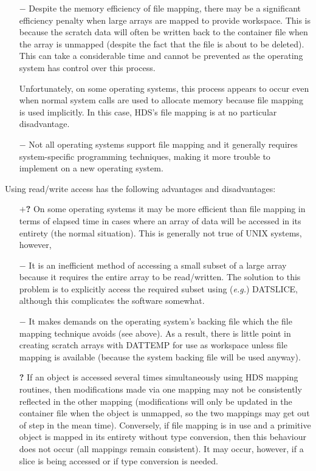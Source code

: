 \documentclass[twoside,11pt]{article}
\newcommand{\htmlref}[2]{#1}
\renewcommand{\_}{\texttt{\symbol{95}}}
\newcommand{\st}[1]{{\em{#1}}}
\newcommand{\mplus}[0]{{$+$}}
\newcommand{\mplus}[0]{+}
\begin{document}
\begin{description}
\begin{itemize}
\item[{\bf $-$}] Despite the memory efficiency of file mapping, there may be
a significant efficiency penalty when large arrays are mapped to
provide workspace. This is because the scratch data will often be
written back to the container file when the array is unmapped (despite
the fact that the file is about to be deleted). This can take a
considerable time and cannot be prevented as the operating system has
control over this process.

Unfortunately, on some operating systems, this process appears to
occur even when normal system calls are used to allocate memory
because file mapping is used implicitly. In this case, HDS's file
mapping is at no particular disadvantage.

\item[{\bf $-$}] Not all operating systems support file mapping and it
generally requires system-specific programming techniques, making it
more trouble to implement on a new operating system.

\end{itemize}

Using read/write access has the following advantages and
disadvantages:

\begin{itemize}

\item[{\bf \mplus?}] On some operating systems it may be more efficient than
file mapping in terms of elapsed time in cases where an array of data
will be accessed in its entirety (the normal situation). This is
generally not true of UNIX systems, however,

\item[{\bf $-$}] It is an inefficient method of accessing a small subset of
a large array because it requires the entire array to be
read/written. The solution to this problem is to explicitly access the
required subset using (\st{e.g.\/}) \htmlref{DAT\_SLICE}{DAT_SLICE},
although this complicates the software somewhat.

\item[{\bf $-$}] It makes demands on the operating system's backing
file which the file mapping technique avoids (see above). As a result,
there is little point in creating scratch arrays with DAT\_TEMP for
use as workspace unless file mapping is available (because the system
backing file will be used anyway).

\item[{\bf ?}] If an object is accessed several times simultaneously using
HDS mapping routines, then modifications made via one mapping may not
be consistently reflected in the other mapping (modifications will
only be updated in the container file when the object is unmapped, so
the two mappings may get out of step in the mean time). Conversely, if
file mapping is in use and a primitive object is mapped in its
entirety without \htmlref{type conversion}{sect:typeconversion}, then
this behaviour does not occur (all mappings remain consistent). It may
occur, however, if a slice is being accessed or if type conversion is
needed.


\end{itemize}
\end{description}
\end{document}
